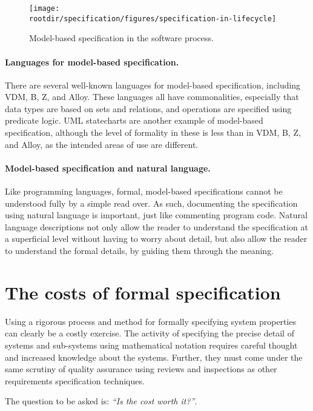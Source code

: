 \begin{figure}[!h]
\centering
\texttt{[image: \\rootdir/specification/figures/specification-in-lifecycle]}
\caption{Model-based specification in the software process.}
\label{fig:specification:sdlc}
\end{figure}

\paragraph{Languages for model-based specification.}
There are several well-known languages for model-based specification, including VDM, B, Z, and Alloy. These languages all have commonalities, especially that data types are based on sets and relations, and operations are specified using predicate logic. UML statecharts are another example of model-based specification, although the level of formality in these is less than in VDM, B, Z, and Alloy, as the intended areas of use are different.

\paragraph{Model-based specification and natural language.}
Like programming languages, formal, model-based specifications cannot be understood fully by a simple read over. As such, documenting the specification using natural language is important, just like commenting program code. Natural language descriptions not only allow the reader to understand the specification at a superficial level without having to worry about detail, but also allow the reader to understand the formal details, by guiding them through the meaning.


\section{The costs of formal specification}
\label{sec:specification:costs}

Using a rigorous process and method for formally specifying system properties can clearly be a costly exercise. The activity of specifying the precise detail of systems and sub-systems using mathematical notation requires careful thought and increased knowledge about the systems. Further, they must come under the same scrutiny of quality assurance using reviews and inspections as other requirements specification techniques. 

The question to be asked is: \emph{``Is the cost worth it?''}.

